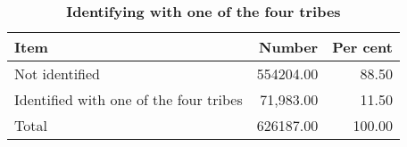 
\begin{table}[htbp]\centering 
\caption{\label{freq_specific_ak} 
\textbf{Identifying with one of the four tribes}}
\begin{tabular} {@{} l r r @{}} \\ \hline
Item& Number & Per cent \\
\hline
Not identified&554204.00&    88.50\\
Identified with one of the four tribes&71,983.00&    11.50\\
Total&626187.00&   100.00\\
\hline
\end{tabular}
\end{table}




